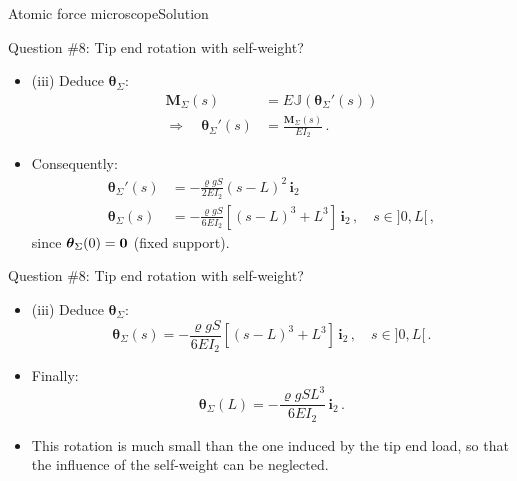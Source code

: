 \documentclass{beamer}
\newcommand{\imply}{\Rightarrow}
\renewcommand{\ij}{i}
\newcommand{\iv}{{\boldsymbol\ij}}
\newcommand*{\drotj}{\theta}
\newcommand*{\drot}{{\boldsymbol\drotj}}
\newcommand*{\Mstaticj}{J}
\newcommand*{\Mstatic}{{\mathbb\Mstaticj}}
\newcommand{\roi}{\varrho}
\newcommand{\Mresj}{M}
\newcommand{\Mres}{{\boldsymbol\Mresj}}
\newcommand{\bzero}{{\bf 0}}
\begin{document}
\begin{frame}{Atomic force microscope}{Solution}
\begin{overprint}
\vskip-20pt
\begin{exampleblock}{Question \#8: Tip end rotation with self-weight?}
\begin{itemize}
\item (iii) Deduce $\drot_\Sigma$:
\begin{displaymath}
\begin{split}
\Mres_\Sigma(s) &= E\Mstatic(\drot_\Sigma'(s)) \\
\imply\quad \drot_\Sigma'(s) &=\frac{\Mres_\Sigma(s)}{EI_2}\,.
\end{split}
\end{displaymath}
\item Consequently:
\begin{displaymath}
\begin{split}
\drot_\Sigma'(s) &=-\frac{\roi g S}{2EI_2}(s-L)^2\,\iv_2 \\
\drot_\Sigma(s) &=-\frac{\roi g S}{6EI_2}[(s-L)^3+L^3]\,\iv_2\,,\quad s\in]0,L[\,,
\end{split}
\end{displaymath}
since $\drot_\Sigma(0)=\bzero$ (fixed support).
\end{itemize}
\end{exampleblock}

\vskip-20pt
\begin{exampleblock}{Question \#8: Tip end rotation with self-weight?}
\begin{itemize}
\item (iii) Deduce $\drot_\Sigma$:
\begin{displaymath}
\drot_\Sigma(s) =-\frac{\roi g S}{6EI_2}[(s-L)^3+L^3]\,\iv_2\,,\quad s\in]0,L[\,.
\end{displaymath}
\item Finally:
\begin{displaymath}
\drot_\Sigma(L) =-\frac{\roi g SL^3}{6EI_2}\,\iv_2\,.
\end{displaymath}
\item This rotation is much small than the one induced by the tip end load, so that the influence of the self-weight can be neglected.
\end{itemize}
\end{exampleblock}

\end{overprint}

\end{frame}
\end{document}
